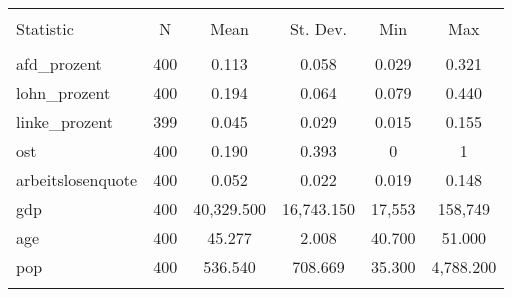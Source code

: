 
\begin{table}[!htbp] \centering 
  \caption{} 
  \label{} 
\begin{tabular}{@{\extracolsep{5pt}}lccccc} 
\\[-1.8ex]\hline 
\hline \\[-1.8ex] 
Statistic & \multicolumn{1}{c}{N} & \multicolumn{1}{c}{Mean} & \multicolumn{1}{c}{St. Dev.} & \multicolumn{1}{c}{Min} & \multicolumn{1}{c}{Max} \\ 
\hline \\[-1.8ex] 
afd\_prozent & 400 & 0.113 & 0.058 & 0.029 & 0.321 \\ 
lohn\_prozent & 400 & 0.194 & 0.064 & 0.079 & 0.440 \\ 
linke\_prozent & 399 & 0.045 & 0.029 & 0.015 & 0.155 \\ 
ost & 400 & 0.190 & 0.393 & 0 & 1 \\ 
arbeitslosenquote & 400 & 0.052 & 0.022 & 0.019 & 0.148 \\ 
gdp & 400 & 40,329.500 & 16,743.150 & 17,553 & 158,749 \\ 
age & 400 & 45.277 & 2.008 & 40.700 & 51.000 \\ 
pop & 400 & 536.540 & 708.669 & 35.300 & 4,788.200 \\ 
\hline \\[-1.8ex] 
\end{tabular} 
\end{table} 
